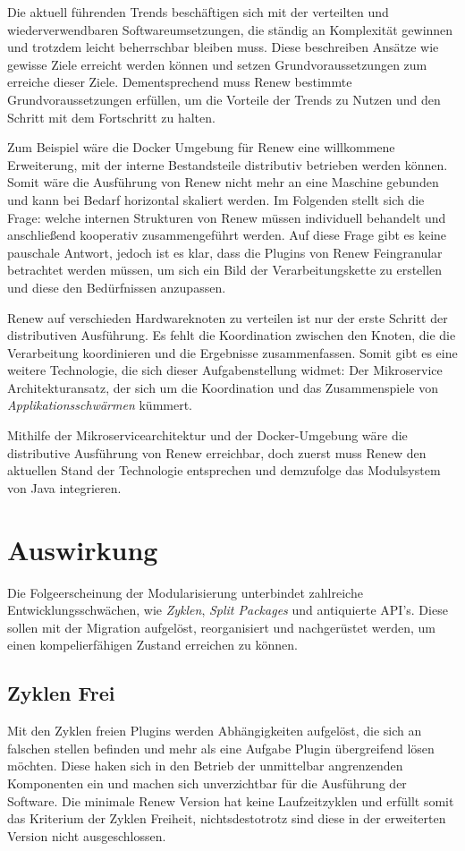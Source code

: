 Die aktuell führenden Trends beschäftigen sich mit der verteilten und wiederverwendbaren Softwareumsetzungen, die ständig an Komplexität gewinnen und trotzdem leicht beherrschbar bleiben muss. Diese beschreiben Ansätze wie gewisse Ziele erreicht werden können und setzen Grundvoraussetzungen zum erreiche dieser Ziele. Dementsprechend muss Renew bestimmte Grundvoraussetzungen erfüllen, um die Vorteile der Trends zu Nutzen und den Schritt mit dem Fortschritt zu halten.  \bigbreak


Zum Beispiel wäre die Docker Umgebung für Renew eine willkommene Erweiterung, mit der interne Bestandsteile distributiv betrieben werden können. Somit wäre die Ausführung von Renew nicht mehr an eine Maschine gebunden und kann bei Bedarf horizontal skaliert werden. Im Folgenden stellt sich die Frage: welche internen Strukturen von Renew müssen individuell behandelt und anschließend kooperativ zusammengeführt werden. Auf diese Frage gibt es keine pauschale Antwort, jedoch ist es klar, dass die Plugins von Renew Feingranular betrachtet werden müssen, um sich ein Bild der Verarbeitungskette zu erstellen und diese den Bedürfnissen anzupassen. \bigbreak

Renew auf verschieden Hardwareknoten zu verteilen ist nur der erste Schritt der distributiven Ausführung. Es fehlt die Koordination zwischen den Knoten, die die Verarbeitung koordinieren und die Ergebnisse zusammenfassen. Somit gibt es eine weitere Technologie, die sich dieser Aufgabenstellung widmet: Der Mikroservice Architekturansatz, der sich um die Koordination und das Zusammenspiele von \textit{Applikationsschwärmen} kümmert. \bigbreak

Mithilfe der Mikroservicearchitektur und der Docker-Umgebung wäre die distributive Ausführung von Renew erreichbar, doch zuerst muss Renew den aktuellen Stand der Technologie entsprechen und demzufolge das Modulsystem von Java integrieren.  


\section{Auswirkung} \label{auswirkung}
	Die Folgeerscheinung der Modularisierung unterbindet zahlreiche Entwicklungsschwächen, wie \textit{Zyklen}, \textit{Split Packages} und antiquierte API's. Diese sollen mit der Migration aufgelöst, reorganisiert und nachgerüstet werden, um einen kompelierfähigen Zustand erreichen zu können.

\subsection{Zyklen Frei} 
	Mit den Zyklen freien Plugins werden Abhängigkeiten aufgelöst, die sich an falschen stellen befinden und mehr als eine Aufgabe Plugin übergreifend lösen möchten. Diese haken sich in den Betrieb der unmittelbar angrenzenden Komponenten ein und machen sich unverzichtbar für die Ausführung der Software. Die minimale Renew Version hat keine Laufzeitzyklen und erfüllt somit das Kriterium der Zyklen Freiheit, nichtsdestotrotz sind diese in der erweiterten Version nicht ausgeschlossen.


